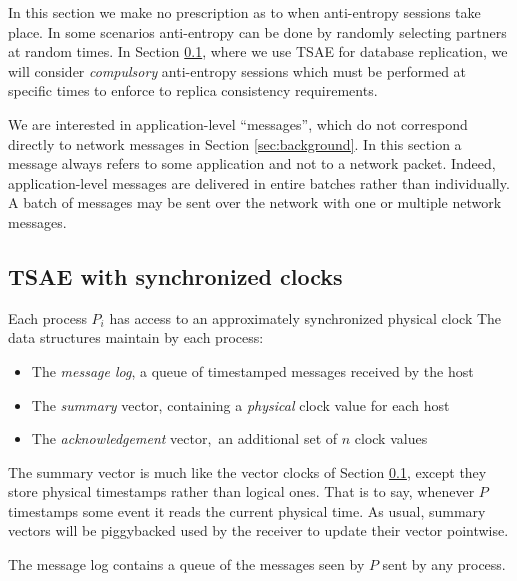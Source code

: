 \documentclass[]             %
{NASA}                       %
\theoremstyle{definition}
\begin{document}
In this section we make no prescription as to when anti-entropy
sessions take place. In some scenarios anti-entropy can be done by
randomly selecting partners at random times. In Section \ref{}, where
we use TSAE for database replication, we will consider
\emph{compulsory} anti-entropy sessions which must be performed at
specific times to enforce to replica consistency requirements.

We are interested in application-level ``messages'', which do not
correspond directly to network messages in Section
\ref{sec:background}. In this section a message always refers to some
application and not to a network packet. Indeed, application-level
messages are delivered in entire batches rather than individually. A
batch of messages may be sent over the network with one or multiple
network messages.

\subsection{TSAE with synchronized clocks}

Each process $P_i$ has access to an approximately synchronized physical clock
The data structures maintain by each process:

\begin{itemize}
\item The \emph{message log}, a queue of timestamped messages received by the host
\item The \emph{summary} vector, containing a \emph{physical} clock value for each host
\item The \emph{acknowledgement} vector,\ an additional set of $n$ clock values
\end{itemize}

The summary vector is much like the vector clocks of Section \ref{},
except they store physical timestamps rather than logical ones. That
is to say, whenever $P$ timestamps some event it reads the current
physical time. As usual, summary vectors will be piggybacked used by
the receiver to update their vector pointwise.

The message log contains a queue of the messages seen by $P$ sent by
any process.

\end{document}
